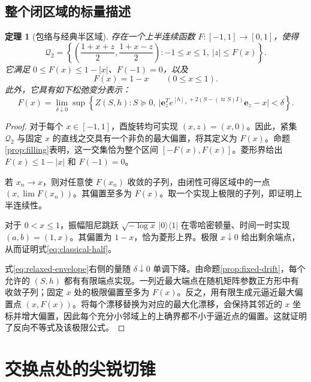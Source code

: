 \documentclass[UTF8,11pt,a4paper,fontset=fandol]{ctexart}
\newtheorem{theorem}{定理}[section]
\theoremstyle{definition}
\theoremstyle{remark}
\DeclareMathOperator{\tr}{tr}
\newcommand{\Q}{\mathcal Q_2}
\newcommand{\ee}{\mathbf e_z}
\newcommand{\PSD}{\succeq0}
\begin{document}
\subsection{整个闭区域的标量描述}
\begin{theorem}[包络与经典半区域]\label{thm:envelope}
存在一个上半连续函数 \(F:[-1,1]\to[0,1]\)，使得
\begin{equation}\label{eq:envelope}
 \Q=\left\{\left(\frac{1+x+z}{2},\frac{1+x-z}{2}\right):
 -1\leq x\leq1,\ |z|\leq F(x)\right\}.
\end{equation}
它满足 \(0\leq F(x)\leq1-|x|\)、\(F(-1)=0\)，以及
\begin{equation}\label{eq:classical-half}
 F(x)=1-x\qquad(0\leq x\leq1).
\end{equation}
此外，它具有如下松弛变分表示：
\begin{equation}\label{eq:relaxed-envelope}
 F(x)=\lim_{\delta\downarrow0}\sup\left\{
 Z(S,h):S\PSD,\ \big|\ee^Te^{[h]_\times+2(S-(\tr S)I)}\ee-x\big|<\delta
 \right\}.
\end{equation}
\end{theorem}
\begin{proof}
对于每个 \(x\in[-1,1]\)，酉旋转均可实现 \((x,z)=(x,0)\)。因此，紧集 \(\Q\) 与固定 \(x\) 的直线之交具有一个非负的最大偏置，将其定义为 \(F(x)\)。命题\ref{prop:filling}表明，这一交集恰为整个区间 \([-F(x),F(x)]\)。菱形界给出 \(F(x)\leq1-|x|\) 和 \(F(-1)=0\)。

若 \(x_n\to x\)，则对任意使 \(F(x_n)\) 收敛的子列，由闭性可得区域中的一点 \((x,\lim F(x_n))\)。其偏置至多为 \(F(x)\)。取一个实现上极限的子列，即证明上半连续性。

对于 \(0<x\leq1\)，振幅阻尼跳跃 \(\sqrt{-\log x}\,|0\rangle\langle1|\) 在零哈密顿量、时间一时实现 \((a,b)=(1,x)\)。其偏置为 \(1-x\)，恰为菱形上界。极限 \(x\downarrow0\) 给出剩余端点，从而证明式\eqref{eq:classical-half}。

式\eqref{eq:relaxed-envelope}右侧的量随 \(\delta\downarrow0\) 单调下降。由命题\ref{prop:fixed-drift}，每个允许的 \((S,h)\) 都有有限端点实现。一列近最大端点在随机矩阵参数正方形中有收敛子列；固定 \(x\) 处的极限偏置至多为 \(F(x)\)。反之，用有限生成元逼近最大偏置点 \((x,F(x))\)。将每个漂移替换为对应的最大化漂移，会保持其邻近的 \(x\) 坐标并增大偏置，因此每个充分小邻域上的上确界都不小于逼近点的偏置。这就证明了反向不等式及该极限公式。
\end{proof}

\section{交换点处的尖锐切锥}\label{sec:swap-cone}
\end{document}
